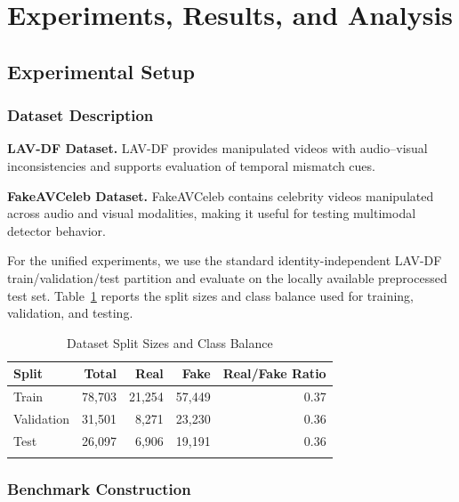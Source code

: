 \documentclass[pdflatex,sn-mathphys-num]{sn-jnl}
\begin{document}
\section{Experiments, Results, and Analysis}\label{sec5}


\subsection{Experimental Setup}\label{sec5.1}


\subsubsection{Dataset Description}\label{sec5.1.1}

\textbf{LAV-DF Dataset.} LAV-DF provides manipulated videos with audio--visual inconsistencies and supports evaluation of temporal mismatch cues.

\textbf{FakeAVCeleb Dataset.} FakeAVCeleb contains celebrity videos manipulated across audio and visual modalities, making it useful for testing multimodal detector behavior.

For the unified experiments, we use the standard identity-independent LAV-DF train/validation/test partition and evaluate on the locally available preprocessed test set. Table~\ref{tab:split} reports the split sizes and class balance used for training, validation, and testing.

\begin{table}[htbp]
\caption{Dataset Split Sizes and Class Balance}\label{tab:split}
\begin{tabular}{@{}lrrrr@{}}
\toprule
\textbf{Split} & \textbf{Total} & \textbf{Real} & \textbf{Fake} & \textbf{Real/Fake Ratio} \\
\midrule
Train & 78,703 & 21,254 & 57,449 & 0.37 \\
Validation & 31,501 & 8,271 & 23,230 & 0.36 \\
Test & 26,097 & 6,906 & 19,191 & 0.36 \\
\botrule
\end{tabular}
\end{table}


\subsubsection{Benchmark Construction}\label{sec5.1.2}
\end{document}
